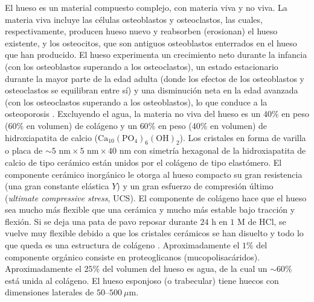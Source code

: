 \documentclass[12pt]{book}
\begin{document}
El hueso es un material compuesto complejo, con materia viva y no viva. La materia viva incluye las células osteoblastos y osteoclastos, las cuales, respectivamente, producen hueso nuevo y reabsorben (erosionan) el hueso existente, y los osteocitos, que son antiguos osteoblastos enterrados en el hueso que han producido. El hueso experimenta un crecimiento neto durante la infancia (con los osteoblastos superando a los osteoclastos), un estado estacionario durante la mayor parte de la edad adulta (donde los efectos de los osteoblastos y osteoclastos se equilibran entre sí) y una disminución neta en la edad avanzada (con los osteoclastos superando a los osteoblastos), lo que conduce a la osteoporosis \cite{71}. Excluyendo el agua, la materia no viva del hueso es un $40\%$ en peso ($60\%$ en volumen) de colágeno y un $60\%$ en peso ($40\%$ en volumen) de hidroxiapatita de calcio ($\text{Ca}_{10}(\text{PO}_4)_6(\text{OH})_2$). Los cristales en forma de varilla o placa de $\sim 5\text{ nm} \times 5\text{ nm} \times 40\text{ nm}$ con simetría hexagonal de la hidroxiapatita de calcio de tipo cerámico están unidos por el colágeno de tipo elastómero. El componente cerámico inorgánico le otorga al hueso compacto su gran resistencia (una gran constante elástica $Y$) y un gran esfuerzo de compresión último (\textit{ultimate compressive stress}, UCS). El componente de colágeno hace que el hueso sea mucho más flexible que una cerámica y mucho más estable bajo tracción y flexión. Si se deja una pata de pavo reposar durante $24\text{ h}$ en $1\text{ M de HCl}$, se vuelve muy flexible debido a que los cristales cerámicos se han disuelto y todo lo que queda es una estructura de colágeno \cite{10}. Aproximadamente el $1\%$ del componente orgánico consiste en proteoglicanos (mucopolisacáridos). Aproximadamente el $25\%$ del volumen del hueso es agua, de la cual un $\sim 60\%$ está unida al colágeno. El hueso esponjoso (o trabecular) tiene huecos con dimensiones laterales de $50\text{--}500\ \mu\text{m}$.
\end{document}
